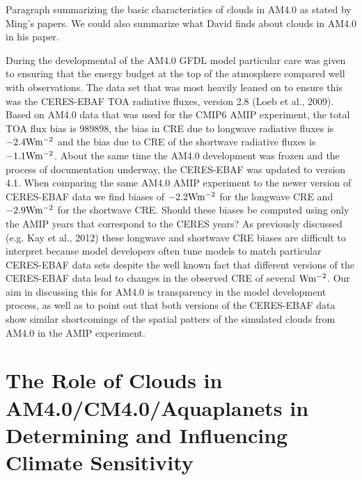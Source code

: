 \documentclass[11pt]{article}   	%
\begin{document}
Paragraph summarizing the basic characteristics of clouds in AM4.0 as stated by Ming's papers.  We could also summarize 
what David finds about clouds in AM4.0 in his paper.

During the developmental of the AM4.0 GFDL model particular care was given to ensuring that the energy budget at 
the top of the atmosphere compared well with observations.  The data set that was most heavily leaned on to ensure 
this was the CERES-EBAF TOA radiative fluxes, version 2.8 (Loeb et al., 2009).  Based on AM4.0 data that was used for 
the CMIP6 AMIP
experiment, the total TOA flux bias is 989898, the bias in CRE 
due to longwave radiative fluxes is $-2.4 \rm{W m^{-2}} $ and the bias due to CRE of the shortwave radiative fluxes   
is $-1.1 \rm{W m^{-2}} $.  About the same time the AM4.0 development was frozen and the process of documentation 
underway, the CERES-EBAF was updated to version 4.1.  When comparing the same AM4.0 AMIP experiment to the 
newer version of CERES-EBAF data we find biases of $-2.2 \rm{W m^{-2}} $ for the longwave CRE and 
$-2.9 \rm{W m^{-2}} $ for the shortwave CRE.   Should these biases be computed using only the AMIP years that 
correspond to the CERES years?   As previously discussed (e.g. Kay et al., 2012) these longwave and shortwave CRE 
biases are difficult to interpret because model developers often tune models to match particular CERES-EBAF data 
sets despite the well known fact that different versions of the CERES-EBAF data lead to changes in the observed CRE of
several $\rm{W m^{-2}}$.   Our aim in discussing this for AM4.0 is transparency in the model development process, as 
well as to point out that both versions of the CERES-EBAF data show similar shortcomings of the spatial patters of the 
simulated clouds  from AM4.0 in the AMIP experiment.   



\section{The Role of Clouds in AM4.0/CM4.0/Aquaplanets in Determining and Influencing Climate Sensitivity}

\end{document}
